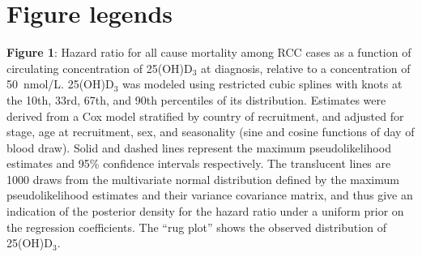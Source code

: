 \documentclass[a4paper,11pt]{article}
\begin{document}
\section*{Figure legends}
\noindent \textbf{Figure 1}: Hazard ratio for all cause mortality among RCC cases as 
a function of circulating concentration of 25(OH)D$_3$ at diagnosis, relative to a 
concentration of 50~nmol/L. 25(OH)D$_3$ was modeled using restricted cubic splines 
with knots at the 10th, 33rd, 67th, and 90th percentiles of its distribution. 
Estimates were derived from a Cox model stratified by country of recruitment, and 
adjusted for stage, age at recruitment, sex, and seasonality (sine and cosine 
functions of day of blood draw). Solid and dashed lines represent the maximum 
pseudolikelihood estimates and 95\% confidence intervals respectively. The 
translucent lines are 1000 draws from the multivariate normal distribution defined 
by the maximum pseudolikelihood estimates and their variance covariance matrix, and 
thus give an indication of the posterior density for the hazard ratio under a 
uniform prior on the regression coefficients. The ``rug plot'' shows the observed 
distribution of 25(OH)D$_3$.
\end{document}
